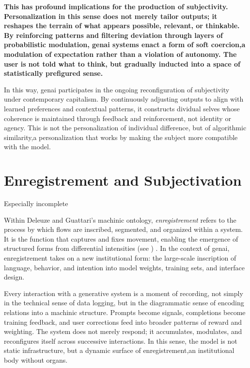 \textbf{This has profound implications for the production of subjectivity. Personalization in this sense does not merely tailor outputs; it reshapes the terrain of what appears possible, relevant, or thinkable. By reinforcing patterns and filtering deviation through layers of probabilistic modulation, \gls{genai} systems enact a form of soft coercion,a modulation of expectation rather than a violation of autonomy. The user is not told what to think, but gradually inducted into a space of statistically prefigured sense.}

In this way, \gls{genai} participates in the ongoing reconfiguration of subjectivity under contemporary capitalism. By continuously adjusting outputs to align with learned preferences and contextual patterns, it constructs dividual selves whose coherence is maintained through feedback and reinforcement, not identity or agency. This is not the personalization of individual difference, but of algorithmic similarity,a personalization that works by making the subject more compatible with the model.

\section{Enregistrement and Subjectivation}


\begin{orangebox}
	Especially incomplete
\end{orangebox}

Within Deleuze and Guattari's machinic ontology, \emph{enregistrement} refers to the process by which flows are inscribed, segmented, and organized within a system. It is the function that captures and fixes movement, enabling the emergence of structured forms from differential intensities (see \cite[4]{deleuze1983}) . In the context of \gls{genai}, enregistrement takes on a new institutional form: the large-scale inscription of language, behavior, and intention into model weights, training sets, and interface design.

Every interaction with a generative system is a moment of recording, not simply in the technical sense of data logging, but in the diagrammatic sense of encoding relations into a machinic structure. Prompts become signals, completions become training feedback, and user corrections feed into broader patterns of reward and weighting. The system does not merely respond; it accumulates, modulates, and reconfigures itself across successive interactions. In this sense, the model is not static infrastructure, but a dynamic surface of enregistrement,an institutional body without organs.

